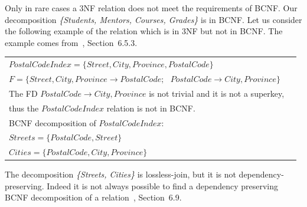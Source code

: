 Only in rare cases a 3NF relation does not meet the requirements of BCNF. Our decomposition 
\textit{\{Students, Mentors, Courses, Grades\}} is in BCNF. Let us consider the following
example of the relation {} which is in 3NF but not in BCNF.  The example 
comes from~\cite{bdb2}, Section~6.5.3.

\begin{center}
\begin{tabular}[h]{l l}
  $PostalCodeIndex = \{Street, City, Province, PostalCode\}$ & \\ [0.5ex]
  $F = \{Street, City, Province \rightarrow PostalCode; \mbox{ } PostalCode \rightarrow City, Province\}$ \\ [1.5ex]
  The FD $PostalCode \rightarrow City, Province$ is not trivial and it is not a superkey, \\ [0.5ex]
  thus the $PostalCodeIndex$ relation is not in BCNF. & \\ [1.5ex]
  BCNF decomposition of $PostalCodeIndex$:   &  \\ [0.5ex]
  $Streets =\{PostalCode, Street\}$ & \\ [0.5ex]
  $Cities = \{PostalCode, City, Province\}$ & \\ [0.5ex]
\end{tabular}
\end{center}

The decomposition \textit{\{Streets, Cities\}} is lossless-join, but it is not dependency-preserving. 
Indeed it is not always possible to find a dependency preserving BCNF decomposition of a relation~\cite{bdb2}, Section~6.9.


